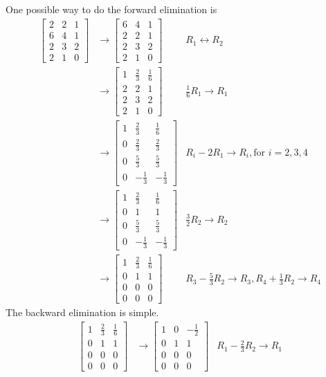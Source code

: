 \begin{solution}
One possible way to do the forward elimination is
\begin{align*}
\begin{bmatrix}
2 & 2 & 1 \\
6 & 4 & 1 \\
2 & 3 & 2 \\
2 & 1 & 0
\end{bmatrix}
&\to
\begin{bmatrix}
6 & 4 & 1 \\
2 & 2 & 1 \\
2 & 3 & 2 \\
2 & 1 & 0
\end{bmatrix}
& R_1 \leftrightarrow R_2 \\
&\to
\begin{bmatrix}
1 & \frac{2}{3} & \frac{1}{6} \\
2 & 2 & 1 \\
2 & 3 & 2 \\
2 & 1 & 0
\end{bmatrix}
& \frac{1}{6}R_1 \to R_1 \\
&\to
\begin{bmatrix}
1 & \frac{2}{3} & \frac{1}{6} \\
0 & \frac{2}{3} & \frac{2}{3} \\
0 & \frac{5}{3} & \frac{5}{3} \\
0 & -\frac{1}{3} & -\frac{1}{3}
\end{bmatrix}
& R_i - 2R_1 \to R_i, \text{for } i = 2,3,4 \\
&\to
\begin{bmatrix}
1 & \frac{2}{3} & \frac{1}{6} \\
0 & 1 & 1 \\
0 & \frac{5}{3} & \frac{5}{3} \\
0 & -\frac{1}{3} & -\frac{1}{3}
\end{bmatrix}
& \frac{3}{2}R_2 \to R_2 \\
&\to
\begin{bmatrix}
1 & \frac{2}{3} & \frac{1}{6} \\
0 & 1 & 1 \\
0 & 0 & 0 \\
0 & 0 & 0
\end{bmatrix}
& R_3 - \frac{5}{3}R_2 \to R_3, R_4 + \frac{1}{3}R_2 \to R_4 
\end{align*}
The backward elimination is simple.
\begin{align*}
\begin{bmatrix}
1 & \frac{2}{3} & \frac{1}{6} \\
0 & 1 & 1 \\
0 & 0 & 0 \\
0 & 0 & 0
\end{bmatrix} 
&\to
\begin{bmatrix}
1 & 0 & -\frac{1}{2} \\
0 & 1 & 1 \\
0 & 0 & 0 \\
0 & 0 & 0
\end{bmatrix} 
& R_1 - \frac{2}{3}R_2 \to R_1
\end{align*}
\end{solution}

